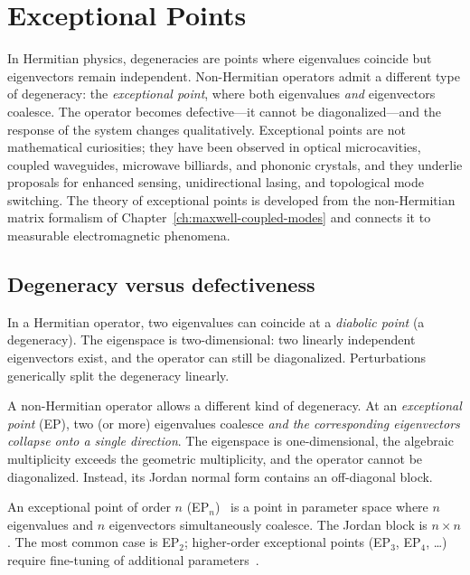 \chapter{Exceptional Points}
\label{ch:exceptional-points}

\begin{chapterlead}
In Hermitian physics, degeneracies are points where eigenvalues coincide
but eigenvectors remain independent. Non-Hermitian operators admit a
different type of degeneracy: the \emph{exceptional point}, where both
eigenvalues \emph{and} eigenvectors coalesce. The operator becomes
defective---it cannot be diagonalized---and the response of the system
changes qualitatively. Exceptional points are not mathematical
curiosities; they have been observed in optical microcavities, coupled
waveguides, microwave billiards, and phononic crystals, and they underlie
proposals for enhanced sensing, unidirectional lasing, and topological
mode switching. The theory of exceptional points is developed from the
non-Hermitian matrix formalism of
Chapter~\ref{ch:maxwell-coupled-modes} and connects it to measurable
electromagnetic phenomena.
\end{chapterlead}


\section{Degeneracy versus defectiveness}
\label{sec:deg-vs-defect}

In a Hermitian operator, two eigenvalues can coincide at a
\emph{diabolic point} (a degeneracy). The eigenspace is two-dimensional:
two linearly independent eigenvectors exist, and the operator can still
be diagonalized. Perturbations generically split the degeneracy
linearly.

A non-Hermitian operator allows a different kind of
degeneracy. At an \emph{exceptional point} (EP), two (or more)
eigenvalues coalesce \emph{and the corresponding eigenvectors collapse
onto a single direction}. The eigenspace is one-dimensional, the
algebraic multiplicity exceeds the geometric multiplicity, and the
operator cannot be diagonalized. Instead, its Jordan normal form
contains an off-diagonal block.

\begin{definition}
An exceptional point of order $n$ (EP$_n$)~\cite{bergholtz2019exceptional,zhen2015spawning,al2019exceptional} is a point in parameter space
where $n$ eigenvalues and $n$ eigenvectors simultaneously coalesce.
The Jordan block is $n\times n$. The most common case is EP$_2$;
higher-order exceptional points (EP$_3$, EP$_4$, \ldots) require
fine-tuning of additional parameters~\cite{kawabata2019classification,wiersig2023petermann}.
\end{definition}


